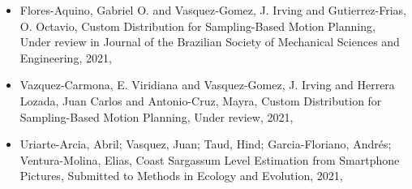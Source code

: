 \begin{itemize} 
\item Flores-Aquino, Gabriel O. and Vasquez-Gomez, J. Irving and Gutierrez-Frias, O. Octavio, Custom Distribution for Sampling-Based Motion Planning, Under review in Journal of the Brazilian Society of Mechanical Sciences and Engineering, 2021, \href{https://arxiv.org/abs/2104.10292}{\faFilePdfO} 
\item Vazquez-Carmona, E. Viridiana and Vasquez-Gomez, J. Irving and Herrera Lozada, Juan Carlos and Antonio-Cruz, Mayra, Custom Distribution for Sampling-Based Motion Planning, Under review, 2021, \href{https://arxiv.org/abs/2105.08743}{\faFilePdfO} 
\item Uriarte-Arcia, Abril; Vasquez, Juan; Taud, Hind; Garcia-Floriano, Andrés; Ventura-Molina, Elias, Coast Sargassum Level Estimation from Smartphone Pictures, Submitted to Methods in Ecology and Evolution, 2021, \href{https://arxiv.org/abs/3939932}{\faFilePdfO} 
\end{itemize} 
